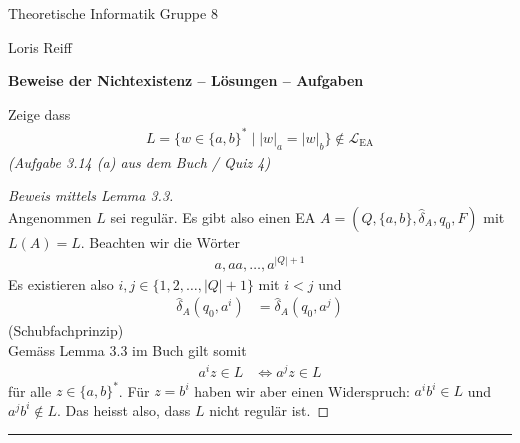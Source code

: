 \documentclass[a4paper,ngerman,12pt]{exam}
\begin{document}
\noindent Theoretische Informatik \hfill Gruppe 8

\hfill Loris Reiff

\begin{center}
  \bfseries\Large
  Beweise der Nichtexistenz \ifprintanswers
  -- Lösungen
  \else
  -- Aufgaben
\fi
\end{center}

\begin{questions}
\question
Zeige dass
\begin{align*}
  L = \{w \in \{a,b\}^* \mid |w|_a = |w|_b\} \not\in \mathcal{L}_{\mathrm{EA}}
\end{align*}
  \textit{(Aufgabe 3.14 (a) aus dem Buch / Quiz 4)}
    \begin{solutionorbox}[18em]
      \begin{proof}[Beweis mittels Lemma 3.3] $ $\\
    Angenommen $L$ sei regulär.
    Es gibt also einen EA $A = (Q, \{a, b\}, \hat{\delta}_A, q_0, F)$ mit $L(A) = L$.
    Beachten wir die Wörter
    \begin{align*}
      a, aa, \dots , a^{|Q|+1}
    \end{align*}
    Es existieren also $i, j \in \{1, 2, \dots, |Q|+1\}$ mit $i < j$
    und
    \begin{align*}
      \hat{\delta}_A(q_0, a^i) &= \hat{\delta}_A(q_0, a^j)
    \end{align*}
    (Schubfachprinzip)\\
    Gemäss Lemma 3.3 im Buch gilt somit
    \begin{align*}
      a^i z \in L &\iff a^j z \in L
    \end{align*}
    für alle $z \in \{a, b\}^*$. Für $z = b^i$ haben wir aber einen Widerspruch:
    $a^i b^i \in L$ und $a^j b^i \not\in L$. Das heisst also, dass
    $L$ nicht regulär ist.
      \end{proof}

      \hrule


\end{solutionorbox}
\end{questions}
\end{document}
